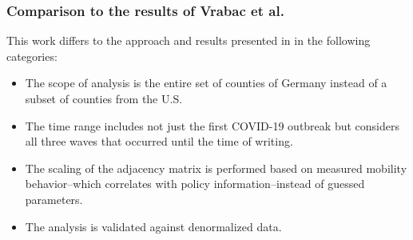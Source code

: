 \subsubsection{Comparison to the results of Vrabac et al.}
This work differs to the approach and results presented in \cite{vrabacCapturingEffectsTransportation2020} in the following categories:

\begin{itemize}
	\item The scope of analysis is the entire set of counties of Germany instead of a subset of counties from the U.S.
	\item The time range includes not just the first COVID-19 outbreak but considers all three waves that occurred until the time of writing.
	\item The scaling of the adjacency matrix is performed based on measured mobility behavior--which correlates with policy information--instead of guessed parameters.
	\item The analysis is validated against denormalized data.
\end{itemize}
